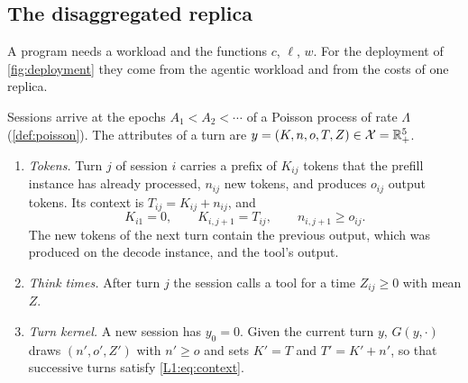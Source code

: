 \subsection{The disaggregated replica}\label{L1:sec:replica}

A program needs a workload and the functions $c$, $\ell$, $w$. For the deployment of
\cref{fig:deployment} they come from the agentic workload and from the costs of one
replica.

\begin{definition}\label{L1:def:workload}
Sessions arrive at the epochs $A_1<A_2<\cdots$ of a Poisson process of rate $\Lambda$
(\cref{def:poisson}). The attributes of a turn are $y=(K,n,o,T,Z)\in\mathcal X=\mathbb{R}_+^5$.
\begin{enumerate}[label=(\alph*)]
\item \emph{Tokens.} Turn $j$ of session $i$ carries a prefix of $K_{ij}$ tokens that
  the prefill instance has already processed, $n_{ij}$ new tokens, and produces
  $o_{ij}$ output tokens. Its context is $T_{ij}=K_{ij}+n_{ij}$, and
  \begin{equation}\label{L1:eq:context}
    K_{i1}=0,\qquad K_{i,j+1}=T_{ij},\qquad n_{i,j+1}\ge o_{ij}.
  \end{equation}
  The new tokens of the next turn contain the previous output, which was produced on
  the decode instance, and the tool's output.
\item \emph{Think times.} After turn $j$ the session calls a tool for a time
  $Z_{ij}\ge0$ with mean $Z$.
\item \emph{Turn kernel.} A new session has $y_0=0$. Given the current turn $y$,
  $G(y,\cdot)$ draws $(n',o',Z')$ with $n'\ge o$ and sets $K'=T$ and $T'=K'+n'$, so that
  successive turns satisfy \eqref{L1:eq:context}.
\end{enumerate}
\end{definition}

